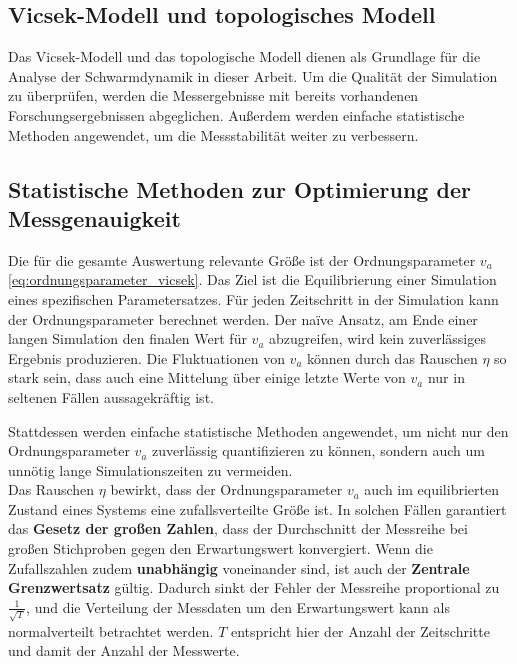 \documentclass{solutionclass}
\begin{document}
\subsection{Vicsek-Modell und topologisches Modell}
Das Vicsek-Modell und das topologische Modell dienen als Grundlage für die Analyse der Schwarmdynamik in dieser Arbeit. Um die Qualität der Simulation zu überprüfen, werden die Messergebnisse mit bereits vorhandenen Forschungsergebnissen abgeglichen. Außerdem werden einfache statistische Methoden angewendet, um die Messstabilität weiter zu verbessern.

\subsection*{Statistische Methoden zur Optimierung der Messgenauigkeit}
Die für die gesamte Auswertung relevante Größe ist der Ordnungsparameter $v_a$ \eqref{eq:ordnungsparameter_vicsek}. Das Ziel ist die Equilibrierung einer Simulation eines spezifischen Parametersatzes. Für jeden Zeitschritt in der Simulation kann der Ordnungsparameter berechnet werden. Der na\"ive Ansatz, am Ende einer langen Simulation den finalen Wert für $v_a$ abzugreifen, wird kein zuverlässiges Ergebnis produzieren. Die Fluktuationen von $v_a$ können durch das Rauschen $\eta$ so stark sein, dass auch eine Mittelung über einige letzte Werte von $v_a$ nur in seltenen Fällen aussagekräftig ist.

Stattdessen werden einfache statistische Methoden angewendet, um nicht nur den Ordnungsparameter $v_a$ zuverlässig quantifizieren zu können, sondern auch um unnötig lange Simulationszeiten zu vermeiden.\\


Das Rauschen $\eta$ bewirkt, dass der Ordnungsparameter $v_a$ auch im equilibrierten Zustand eines Systems eine zufallsverteilte Größe ist. In solchen Fällen garantiert das \textbf{Gesetz der großen Zahlen}, dass der Durchschnitt der Messreihe bei großen Stichproben gegen den Erwartungswert konvergiert. Wenn die Zufallszahlen zudem \textbf{unabhängig} voneinander sind, ist auch der \textbf{Zentrale Grenzwertsatz} gültig. Dadurch sinkt der Fehler der Messreihe proportional zu $\tfrac{1}{\sqrt{T}}$, und die Verteilung der Messdaten um den Erwartungswert kann als normalverteilt betrachtet werden. $T$ entspricht hier der Anzahl der Zeitschritte und damit der Anzahl der Messwerte.\\
\end{document}
